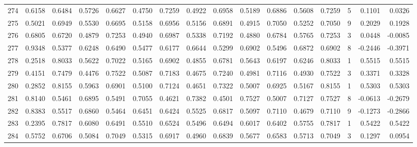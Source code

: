 \begin{tabular}{lrrrrrrrrrrrrrrr}
274 &      0.6158 &  0.6484 &  0.5726 &  0.6627 &  0.4750 &  0.7259 &  0.4922 &  0.6958 &  0.5189 &  0.6886 &   0.5608 &     0.7259 &      5 &                    0.1101 &                     0.0326 \\
275 &      0.5021 &  0.6949 &  0.5530 &  0.6695 &  0.5158 &  0.6956 &  0.5156 &  0.6891 &  0.4915 &  0.7050 &   0.5252 &     0.7050 &      9 &                    0.2029 &                     0.1928 \\
276 &      0.6805 &  0.6720 &  0.4879 &  0.7253 &  0.4940 &  0.6987 &  0.5338 &  0.7192 &  0.4880 &  0.6784 &   0.5765 &     0.7253 &      3 &                    0.0448 &                    -0.0085 \\
277 &      0.9348 &  0.5377 &  0.6248 &  0.6490 &  0.5477 &  0.6177 &  0.6644 &  0.5299 &  0.6902 &  0.5496 &   0.6872 &     0.6902 &      8 &                   -0.2446 &                    -0.3971 \\
278 &      0.2518 &  0.8033 &  0.5622 &  0.7022 &  0.5165 &  0.6902 &  0.4855 &  0.6781 &  0.5643 &  0.6197 &   0.6246 &     0.8033 &      1 &                    0.5515 &                     0.5515 \\
279 &      0.4151 &  0.7479 &  0.4476 &  0.7522 &  0.5087 &  0.7183 &  0.4675 &  0.7240 &  0.4981 &  0.7116 &   0.4930 &     0.7522 &      3 &                    0.3371 &                     0.3328 \\
280 &      0.2852 &  0.8155 &  0.5963 &  0.6901 &  0.5100 &  0.7124 &  0.4651 &  0.7322 &  0.5007 &  0.6925 &   0.5167 &     0.8155 &      1 &                    0.5303 &                     0.5303 \\
281 &      0.8140 &  0.5461 &  0.6895 &  0.5491 &  0.7055 &  0.4621 &  0.7382 &  0.4501 &  0.7527 &  0.5007 &   0.7127 &     0.7527 &      8 &                   -0.0613 &                    -0.2679 \\
282 &      0.8383 &  0.5517 &  0.6860 &  0.5464 &  0.6451 &  0.6424 &  0.5525 &  0.6817 &  0.5097 &  0.7110 &   0.4679 &     0.7110 &      9 &                   -0.1273 &                    -0.2866 \\
283 &      0.2395 &  0.7817 &  0.6080 &  0.6491 &  0.5510 &  0.6524 &  0.5496 &  0.6494 &  0.6017 &  0.6402 &   0.5755 &     0.7817 &      1 &                    0.5422 &                     0.5422 \\
284 &      0.5752 &  0.6706 &  0.5084 &  0.7049 &  0.5315 &  0.6917 &  0.4960 &  0.6839 &  0.5677 &  0.6583 &   0.5713 &     0.7049 &      3 &                    0.1297 &                     0.0954 \\

\end{tabular}
